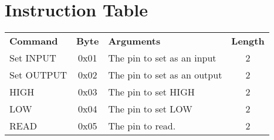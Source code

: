 \documentclass[letterpaper,titlepage]{article}
\begin{document}
	\section*{Instruction Table}
	\begin{tabular}{l | c | l | c}
	\textbf{Command} & \textbf{Byte} & \textbf{Arguments} & \textbf{Length} \\
	Set INPUT & 0x01 & The pin to set as an input & 2 \\
	Set OUTPUT & 0x02 & The pin to set as an output & 2\\
	HIGH & 0x03 & The pin to set HIGH & 2 \\
	LOW & 0x04 & The pin to set LOW & 2 \\
	READ & 0x05 & The pin to read. & 2 \\
	\end{tabular} \\
	\clearpage
\end{document}
